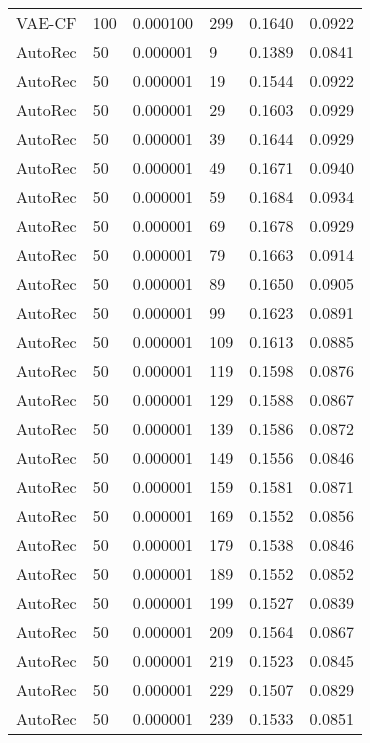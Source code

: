 \begin{tabular}{llrlrr}
  VAE-CF &  100 &  0.000100 &   299 &  0.1640 &       0.0922 \\
 AutoRec &   50 &  0.000001 &     9 &  0.1389 &       0.0841 \\
 AutoRec &   50 &  0.000001 &    19 &  0.1544 &       0.0922 \\
 AutoRec &   50 &  0.000001 &    29 &  0.1603 &       0.0929 \\
 AutoRec &   50 &  0.000001 &    39 &  0.1644 &       0.0929 \\
 AutoRec &   50 &  0.000001 &    49 &  0.1671 &       0.0940 \\
 AutoRec &   50 &  0.000001 &    59 &  0.1684 &       0.0934 \\
 AutoRec &   50 &  0.000001 &    69 &  0.1678 &       0.0929 \\
 AutoRec &   50 &  0.000001 &    79 &  0.1663 &       0.0914 \\
 AutoRec &   50 &  0.000001 &    89 &  0.1650 &       0.0905 \\
 AutoRec &   50 &  0.000001 &    99 &  0.1623 &       0.0891 \\
 AutoRec &   50 &  0.000001 &   109 &  0.1613 &       0.0885 \\
 AutoRec &   50 &  0.000001 &   119 &  0.1598 &       0.0876 \\
 AutoRec &   50 &  0.000001 &   129 &  0.1588 &       0.0867 \\
 AutoRec &   50 &  0.000001 &   139 &  0.1586 &       0.0872 \\
 AutoRec &   50 &  0.000001 &   149 &  0.1556 &       0.0846 \\
 AutoRec &   50 &  0.000001 &   159 &  0.1581 &       0.0871 \\
 AutoRec &   50 &  0.000001 &   169 &  0.1552 &       0.0856 \\
 AutoRec &   50 &  0.000001 &   179 &  0.1538 &       0.0846 \\
 AutoRec &   50 &  0.000001 &   189 &  0.1552 &       0.0852 \\
 AutoRec &   50 &  0.000001 &   199 &  0.1527 &       0.0839 \\
 AutoRec &   50 &  0.000001 &   209 &  0.1564 &       0.0867 \\
 AutoRec &   50 &  0.000001 &   219 &  0.1523 &       0.0845 \\
 AutoRec &   50 &  0.000001 &   229 &  0.1507 &       0.0829 \\
 AutoRec &   50 &  0.000001 &   239 &  0.1533 &       0.0851 \\

\end{tabular}
